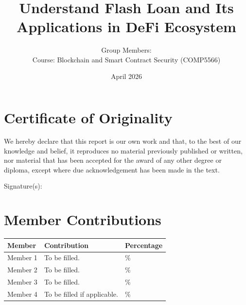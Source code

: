 \documentclass[12pt,a4paper]{article}
\title{Understand Flash Loan and Its Applications in DeFi Ecosystem}
\author{
  Group Members: \underline{\hspace{10cm}} \\
  Course: Blockchain and Smart Contract Security (COMP5566)
}
\date{April 2026}
\begin{document}
\maketitle
\thispagestyle{empty}

\section*{Certificate of Originality}
We hereby declare that this report is our own work and that, to the best of our knowledge and belief, it reproduces no material previously published or written, nor material that has been accepted for the award of any other degree or diploma, except where due acknowledgement has been made in the text.

\vspace{1.5em}
Signature(s): \underline{\hspace{10cm}}

\vspace{2em}
\section*{Member Contributions}
\begin{longtable}{p{} p{} p{}}
\toprule
Member & Contribution & Percentage \\
\midrule
Member 1 & To be filled. & \% \\
Member 2 & To be filled. & \% \\
Member 3 & To be filled. & \% \\
Member 4 & To be filled if applicable. & \% \\
\bottomrule
\end{longtable}

\newpage
\tableofcontents
\newpage











\end{document}
